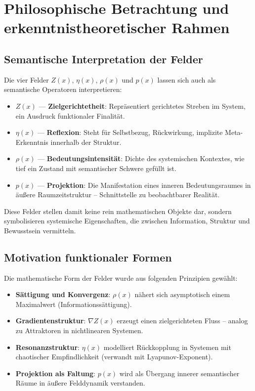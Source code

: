 \documentclass[11pt]{article}
\begin{document}
\section*{Philosophische Betrachtung und erkenntnistheoretischer Rahmen}

\subsection*{Semantische Interpretation der Felder}

Die vier Felder $Z(x)$, $\eta(x)$, $\rho(x)$ und $p(x)$ lassen sich auch als semantische Operatoren interpretieren:

\begin{itemize}
  \item $Z(x)$ --- \textbf{Zielgerichtetheit}: Repräsentiert gerichtetes Streben im System, ein Ausdruck funktionaler Finalität.
  \item $\eta(x)$ --- \textbf{Reflexion}: Steht für Selbstbezug, Rückwirkung, implizite Meta-Erkenntnis innerhalb der Struktur.
  \item $\rho(x)$ --- \textbf{Bedeutungsintensität}: Dichte des systemischen Kontextes, wie tief ein Zustand mit semantischer Schwere gefüllt ist.
  \item $p(x)$ --- \textbf{Projektion}: Die Manifestation eines inneren Bedeutungsraumes in äußere Raumzeitstruktur -- Schnittstelle zu beobachtbarer Realität.
\end{itemize}

Diese Felder stellen damit keine rein mathematischen Objekte dar,  
sondern symbolisieren systemische Eigenschaften, die zwischen Information, Struktur und Bewusstsein vermitteln.

\subsection*{Motivation funktionaler Formen}

Die mathematische Form der Felder wurde aus folgenden Prinzipien gewählt:

\begin{itemize}
  \item \textbf{Sättigung und Konvergenz}: $\rho(x)$ nähert sich asymptotisch einem Maximalwert (Informationssättigung).
  \item \textbf{Gradientenstruktur}: $\nabla Z(x)$ erzeugt einen zielgerichteten Fluss -- analog zu Attraktoren in nichtlinearen Systemen.
  \item \textbf{Resonanzstruktur}: $\eta(x)$ modelliert Rückkopplung in Systemen mit chaotischer Empfindlichkeit (verwandt mit Lyapunov-Exponent).
  \item \textbf{Projektion als Faltung}: $p(x)$ wird als Übergang innerer semantischer Räume in äußere Felddynamik verstanden.
\end{itemize}
\end{document}
